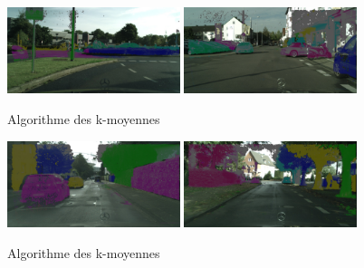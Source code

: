 \documentclass[titlepage,11pt,a4paper]{article}
\begin{document}
\begin{figure}[H]
  \centering
    \includegraphics[width=0.45\textwidth]{images/result_clustering/result_4.jpg}
  \hfill{}
    \includegraphics[width=0.45\textwidth]{images/result_clustering/result_5.jpg}
  \hfill 
  \caption{Algorithme des k-moyennes}
\end{figure} 
\begin{figure}[H]
  \centering
    \includegraphics[width=0.45\textwidth]{images/result_clustering/result_6.jpg}
  \hfill{}
    \includegraphics[width=0.45\textwidth]{images/result_clustering/result_7.jpg}
  \hfill 
  \caption{Algorithme des k-moyennes}
\end{figure}
\end{document}
